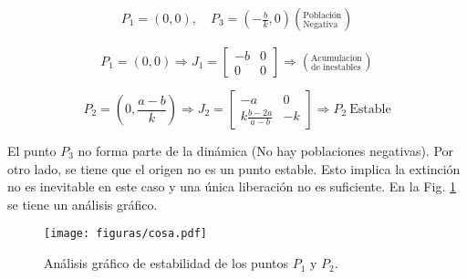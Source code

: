 \documentclass[twocolumn,aps,prl]{revtex4-1}
\begin{document}


$$
\begin{aligned}
    P_1 = (0, 0), \quad P_3 = \left(- \frac{b}{k}, 0 \right) \left(^\text{Población}_\text{Negativa} \right)
\end{aligned}
$$


$$
P_1 = (0, 0)
\Rightarrow
J_1 = 
\begin{bmatrix}
    -b & 0 \\
    0 & 0
\end{bmatrix} \Rightarrow (^\text{Acumulacion}_\text{de inestables})
$$

$$
P_2 = \left( 0, \frac{a-b}{k} \right)  \Rightarrow  
J_2 = 
\begin{bmatrix}
    -a & 0  \\
    k \frac{b - 2a}{ a - b } & -k 
\end{bmatrix}
\Rightarrow  P_2 \ \text{Estable}
$$

El punto $P_3$ no forma parte de la dinámica (No hay poblaciones negativas). Por otro lado, se tiene que el origen no es un punto estable. Esto implica la extinción no es inevitable en este caso y una única liberación no es suficiente. En la Fig. \ref{fig:cosa} se tiene un análisis gráfico.

\begin{figure}[!ht]
    \centering  
    \texttt{[image: figuras/cosa.pdf]}
    \caption{Análisis gráfico de estabilidad de los puntos $P_1$ y $P_2$.}
    \label{fig:cosa}
\end{figure}
\end{document}
